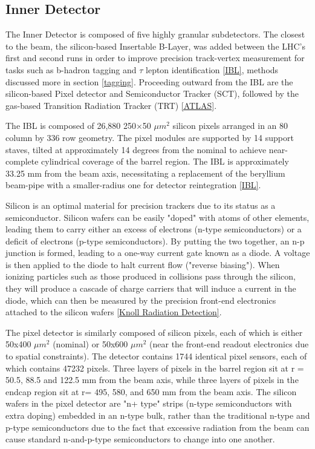 \subsection{Inner Detector} \label{sec:ID} 

The Inner Detector is composed of five highly granular subdetectors. The closest to the beam, the silicon-based Insertable B-Layer, was added between the LHC's first and second runs in order to improve precision track-vertex measurement for tasks such as b-hadron tagging and \( \tau\) lepton identification \ref{IBL}, methods discussed more in section \ref{tagging}. Proceeding outward from the IBL are the silicon-based Pixel detector and Semiconductor Tracker (SCT), followed by the gas-based Transition Radiation Tracker (TRT) \ref{ATLAS}. 

The IBL is composed of 26,880 250×50 \(μm^2\) silicon pixels arranged in an 80 column by 336 row geometry. The pixel modules are supported by 14 support staves, tilted at approximately 14 degrees from the nominal to achieve near-complete cylindrical coverage of the barrel region. The IBL is approximately 33.25 mm from the beam axis, necessitating a replacement of the beryllium beam-pipe with a smaller-radius one for detector reintegration \ref{IBL}.

Silicon is an optimal material for precision trackers due to its status as a semiconductor. Silicon wafers can be easily "doped" with atoms of other elements, leading them to carry either an excess of electrons (n-type semiconductors) or a deficit of electrons (p-type semiconductors). By putting the two together, an n-p junction is formed, leading to a one-way current gate known as a diode. A voltage is then applied to the diode to halt current flow ("reverse biasing"). When ionizing particles such as those produced in collisions pass through the silicon, they will produce a cascade of charge carriers that will induce a current in the diode, which can then be measured by the precision front-end electronics attached to the silicon wafers \ref{Knoll Radiation Detection}.

The pixel detector is similarly composed of silicon pixels, each of which is either 50x400 \(μm^2\) (nominal) or 50x600 \(μm^2\) (near the front-end readout electronics due to spatial constraints). The detector contains 1744 identical pixel sensors, each of which contains 47232 pixels. Three layers of pixels in the barrel region sit at r = 50.5,  88.5 and 122.5 mm from the beam axis, while three layers of pixels in the endcap region sit at r= 495, 580, and 650 mm from the beam axis. The silicon wafers in the pixel detector are "n+ type" strips (n-type semiconductors with extra doping) embedded in an n-type bulk, rather than the traditional n-type and p-type semiconductors due to the fact that excessive radiation from the beam can cause standard n-and-p-type semiconductors to change into one another. 


